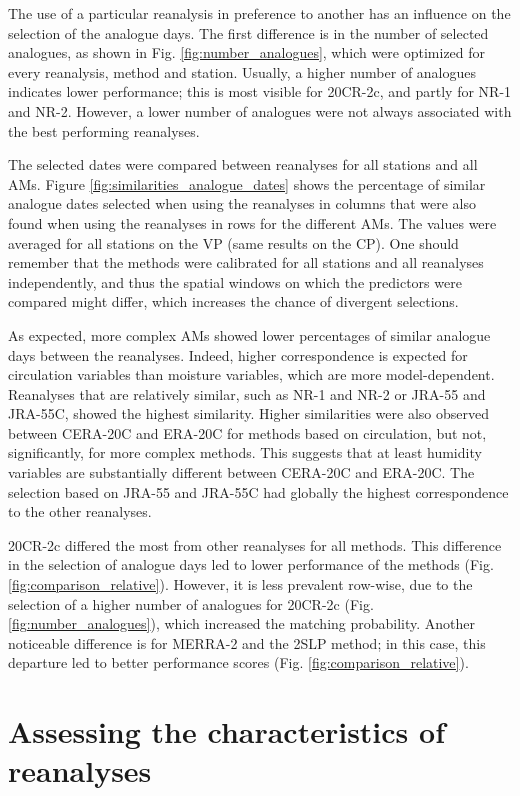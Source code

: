 \documentclass{ametsoc}
\begin{document}
	The use of a particular reanalysis in preference to another has an influence on the selection of the analogue days. The first difference is in the number of selected analogues, as shown in Fig. \ref{fig:number_analogues}, which were optimized for every reanalysis, method and station. Usually, a higher number of analogues indicates lower performance; this is most visible for 20CR-2c, and partly for NR-1 and NR-2. However, a lower number of analogues were not always associated with the best performing reanalyses.
	
	The selected dates were compared between reanalyses for all stations and all AMs. Figure \ref{fig:similarities_analogue_dates} shows the percentage of similar analogue dates selected when using the reanalyses in columns that were also found when using the reanalyses in rows for the different AMs. The values were averaged for all stations on the VP (same results on the CP). One should remember that the methods were calibrated for all stations and all reanalyses independently, and thus the spatial windows on which the predictors were compared might differ, which increases the chance of divergent selections.
	
	As expected, more complex AMs showed lower percentages of similar analogue days between the reanalyses. Indeed, higher correspondence is expected for circulation variables than moisture variables, which are more model-dependent. Reanalyses that are relatively similar, such as NR-1 and NR-2 or JRA-55 and JRA-55C, showed the highest similarity. Higher similarities were also observed between CERA-20C and ERA-20C for methods based on circulation, but not, significantly, for more complex methods. This suggests that at least humidity variables are substantially different between CERA-20C and ERA-20C. The selection based on JRA-55 and JRA-55C had globally the highest correspondence to the other reanalyses.
	
	20CR-2c differed the most from other reanalyses for all methods. This difference in the selection of analogue days led to lower performance of the methods (Fig. \ref{fig:comparison_relative}). However, it is less prevalent row-wise, due to the selection of a higher number of analogues for 20CR-2c (Fig. \ref{fig:number_analogues}), which increased the matching probability. Another noticeable difference is for MERRA-2 and the 2SLP method; in this case, this departure led to better performance scores (Fig. \ref{fig:comparison_relative}).
	
	
	\section{Assessing the characteristics of reanalyses}
	\label{sec:analyzes}
	
\end{document}
